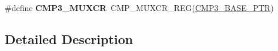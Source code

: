 \begin{DoxyCompactItemize}
\item 
\hypertarget{group___c_m_p___register___accessor___macros_ga65d8721aee0c51ae4bcf5f978c4de3af}{}\#define {\bfseries C\+M\+P3\+\_\+\+M\+U\+X\+C\+R}~C\+M\+P\+\_\+\+M\+U\+X\+C\+R\+\_\+\+R\+E\+G(\hyperlink{group___c_m_p___peripheral_ga793306a1014f5112aa61f346fe3bb2c0}{C\+M\+P3\+\_\+\+B\+A\+S\+E\+\_\+\+P\+T\+R})\label{group___c_m_p___register___accessor___macros_ga65d8721aee0c51ae4bcf5f978c4de3af}

\end{DoxyCompactItemize}


\subsection{Detailed Description}
